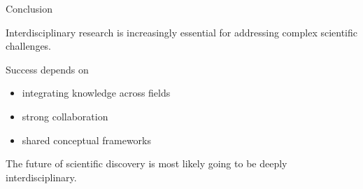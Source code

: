 \documentclass{beamer}
\begin{document}

\begin{frame}{Conclusion}

Interdisciplinary research is increasingly essential
for addressing complex scientific challenges.

Success depends on

\begin{itemize}
\item integrating knowledge across fields
\item strong collaboration
\item shared conceptual frameworks
\end{itemize}

The future of scientific discovery is most likely going to be
deeply interdisciplinary.

\end{frame}
\end{document}
